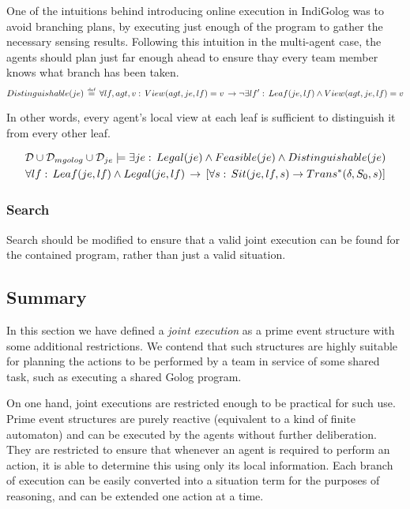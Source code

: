 One of the intuitions behind introducing online execution in IndiGolog
was to avoid branching plans, by executing just enough of the program
to gather the necessary sensing results. Following this intuition
in the multi-agent case, the agents should plan just far enough ahead
to ensure thay every team member knows what branch has been taken.\[
Distinguishable(je)\,\stackrel{\mbox{\tiny def}}{=}\,\forall lf,agt,v:\, View(agt,je,lf)=v\,\rightarrow\neg\exists lf':\, Leaf(je,lf)\wedge View(agt,je,lf)=v\]


In other words, every agent's local view at each leaf is sufficient
to distinguish it from every other leaf.

\begin{multline*}
\mathcal{D}\cup\mathcal{D}_{mgolog}\cup\mathcal{D}_{je}\models\exists je:\, Legal(je)\wedge Feasible(je)\wedge Distinguishable(je)\\
\forall lf:\, Leaf(je,lf)\wedge Legal(je,lf)\,\rightarrow\,\left[\forall s:\, Sit(je,lf,s)\rightarrow Trans^{*}(\delta,S_{0},s)\right]\end{multline*}



\subsubsection{Search}

Search should be modified to ensure that a valid joint execution can
be found for the contained program, rather than just a valid situation.


\subsection{Summary\label{sec:JointExec:Summary}}

In this section we have defined a \emph{joint execution} as a prime
event structure with some additional restrictions. We contend that
such structures are highly suitable for planning the actions to be
performed by a team in service of some shared task, such as executing
a shared Golog program.

On one hand, joint executions are restricted enough to be practical
for such use. Prime event structures are purely reactive (equivalent
to a kind of finite automaton) and can be executed by the agents without
further deliberation. They are restricted to ensure that whenever
an agent is required to perform an action, it is able to determine
this using only its local information. Each branch of execution can
be easily converted into a situation term for the purposes of reasoning,
and can be extended one action at a time.

